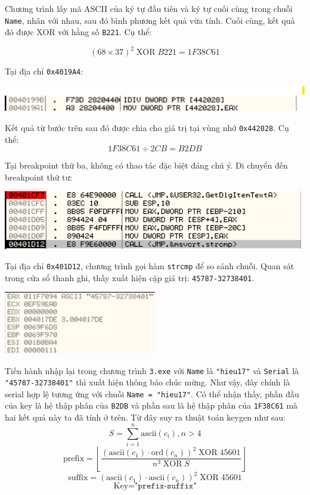 Chương trình lấy mã ASCII của ký tự đầu tiên và ký tự cuối cùng trong chuỗi \texttt{Name}, nhân với nhau, sau đó bình phương kết quả vừa tính. Cuối cùng, kết quả đó được XOR với hằng số \texttt{B221}. Cụ thể:

\[
(68 \times 37)^2 \;\mathrm{XOR}\; B221 = 1F38C61
\]

Tại địa chỉ \texttt{0x4019A4}:

\begin{center}
    \includegraphics[width=\textwidth]{img/file-3/7.png}
\end{center}

Kết quả từ bước trên sau đó được chia cho giá trị tại vùng nhớ \texttt{0x442028}. Cụ thể: 
\[
    1F38C61 \div 2CB = B2DB
\] 

Tại breakpoint thứ ba, không có thao tác đặc biệt đáng chú ý. Di chuyển đến breakpoint thứ tư:

\begin{center}
    \includegraphics[width=\textwidth]{img/file-3/8.png}
\end{center}

Tại địa chỉ \texttt{0x401D12}, chương trình gọi hàm \texttt{strcmp} để so sánh chuỗi. Quan sát trong cửa sổ thanh ghi, thấy xuất hiện cặp giá trị: \texttt{45787-32738401}.

\begin{center}
    \includegraphics[width=0.5\textwidth]{img/file-3/9.png}
\end{center}

Tiến hành nhập lại trong chương trình \texttt{3.exe} với \texttt{Name} là \texttt{"hieu17"} và \texttt{Serial} là \texttt{"45787-32738401"} thì xuất hiện thông báo chúc mừng. Như vậy, đây chính là serial hợp lệ tương ứng với chuỗi \texttt{Name = "hieu17"}.
Có thể nhận thấy, phần đầu của key là hệ thập phân của \texttt{B2DB} và phần sau là hệ thập phân của \texttt{1F38C61} mà hai kết quả này ta đã tính ở trên.
Từ đây suy ra thuật toán keygen như sau:
\[
S = \sum_{i=1}^{n} \mathrm{ascii}(c_i), n > 4
\]
\[
\text{prefix} = \left\lfloor \dfrac{ \left( \mathrm{ascii}(c_1) \cdot \mathrm{ord}(c_n) \right)^2 \;\mathrm{XOR}\; 45601 }{ n^3 \;\mathrm{XOR}\; S } \right\rfloor
\]
\[
\text{suffix} = \left( \mathrm{ascii}(c_1) \cdot \mathrm{ascii}(c_n) \right)^2 \;\mathrm{XOR}\; 45601
\]
\[
\text{Key} = \text{"}\texttt{prefix} \text{-} \texttt{suffix}\text{"}
\]

